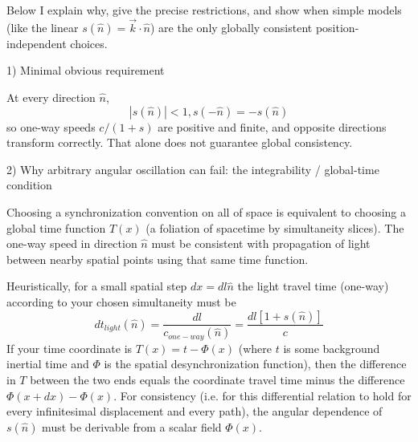 \documentclass[a4paper]{article}
\theoremstyle{plain}
\theoremstyle{definition}
\newcommand{\vect}[1]{\vec{#1}}
\newcommand{\hatvec}[1]{\hat{#1}}
\begin{document}
Below I explain why, give the precise restrictions, and show when
simple models (like the linear
$s(\hatvec{n}) = \vect{k} \cdot \hatvec{n}$)
are the only globally consistent position-independent choices.

1) Minimal obvious requirement

At every direction $\hatvec{n}$,
\begin{equation}
|s(\hatvec{n})| < 1, s(-\hatvec{n}) = -s(\hatvec{n})
\end{equation}
so one-way speeds $c/(1+s)$ are positive and finite, and opposite
directions transform correctly.  That alone does not guarantee global
consistency.

2) Why arbitrary angular oscillation can fail: the integrability /
global-time condition

Choosing a synchronization convention on all of space is equivalent to
choosing a global time function $T(x)$ (a foliation of spacetime by
simultaneity slices).  The one-way speed in direction $\hatvec{n}$
must be consistent with propagation of light between nearby spatial
points using that same time function.

Heuristically, for a small spatial step $dx = dl \hatvec{n}$ the light
travel time (one-way) according to your chosen simultaneity must be
\begin{equation}
dt_{light}(\hatvec{n})
  = \frac{dl}{c_{one-way}(\hatvec{n})}
  = \frac{dl[1+s(\hatvec{n})]}{c}
\end{equation}
If your time coordinate is $T(x) = t-\Phi(x)$ (where $t$ is some
background inertial time and $\Phi$ is the spatial desynchronization
function), then the difference in $T$ between the two ends equals the
coordinate travel time minus the difference $\Phi(x+dx) - \Phi(x)$.
For consistency (i.e. for this differential relation to hold for every
infinitesimal displacement and every path), the angular dependence of
$s(\hatvec{n})$ must be derivable from a scalar field $\Phi(x)$.
\end{document}
